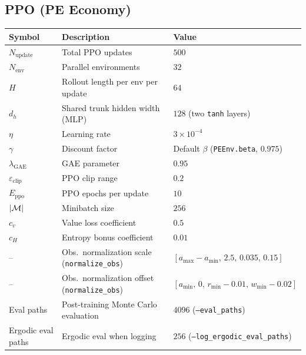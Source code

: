 \subsection{PPO (PE Economy)}
\label{appendix_hyper_ppo_pe}
\begin{table}[H]
  \centering
  \small
  \setlength{\tabcolsep}{6pt}
  \renewcommand{\arraystretch}{1.15}
  \begin{tabular}{@{}p{2.4cm}p{6.2cm}p{4.8cm}@{}}
    \toprule
    Symbol & Description & Value \\
    \midrule
    $N_{\mathrm{update}}$ & Total PPO updates & $500$ \\
    $N_{\mathrm{env}}$ & Parallel environments & $32$ \\
    $H$ & Rollout length per env per update & $64$ \\
    $d_h$ & Shared trunk hidden width (MLP) & $128$ (two \texttt{tanh} layers) \\
    $\eta$ & Learning rate & $3\times 10^{-4}$ \\
    $\gamma$ & Discount factor & Default $\beta$ (\texttt{PEEnv.beta}, $0.975$) \\
    $\lambda_{\mathrm{GAE}}$ & GAE parameter & $0.95$ \\
    $\varepsilon_{\mathrm{clip}}$ & PPO clip range & $0.2$ \\
    $E_{\mathrm{ppo}}$ & PPO epochs per update & $10$ \\
    $|{\cal M}|$ & Minibatch size & $256$ \\
    $c_v$ & Value loss coefficient & $0.5$ \\
    $c_H$ & Entropy bonus coefficient & $0.01$ \\
    -- & Obs.\ normalization scale (\texttt{normalize\_obs}) & $[a_{\max}{-}a_{\min},\,2.5,\,0.035,\,0.15]$ \\
    -- & Obs.\ normalization offset (\texttt{normalize\_obs}) & $[a_{\min},\,0,\,r_{\min}{-}0.01,\,w_{\min}{-}0.02]$ \\
    Eval paths & Post-training Monte Carlo evaluation & $4096$ (\texttt{--eval\_paths}) \\
    Ergodic eval paths & Ergodic eval when logging & $256$ (\texttt{--log\_ergodic\_eval\_paths}) \\
    \bottomrule
  \end{tabular}
\end{table}

